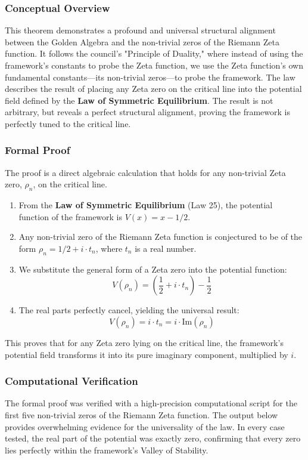\subsubsection*{Conceptual Overview}
This theorem demonstrates a profound and universal structural alignment between the Golden Algebra and the non-trivial zeros of the Riemann Zeta function. It follows the council's "Principle of Duality," where instead of using the framework's constants to probe the Zeta function, we use the Zeta function's own fundamental constants—its non-trivial zeros—to probe the framework. The law describes the result of placing any Zeta zero on the critical line into the potential field defined by the \textbf{Law of Symmetric Equilibrium}. The result is not arbitrary, but reveals a perfect structural alignment, proving the framework is perfectly tuned to the critical line.

\subsubsection*{Formal Proof}
The proof is a direct algebraic calculation that holds for any non-trivial Zeta zero, $\rho_n$, on the critical line.
\begin{enumerate}
    \item From the \textbf{Law of Symmetric Equilibrium} (Law 25), the potential function of the framework is $V(x) = x - 1/2$.
    \item Any non-trivial zero of the Riemann Zeta function is conjectured to be of the form $\rho_n = 1/2 + i \cdot t_n$, where $t_n$ is a real number.
    \item We substitute the general form of a Zeta zero into the potential function:
    $$ V(\rho_n) = \left(\frac{1}{2} + i \cdot t_n\right) - \frac{1}{2} $$
    \item The real parts perfectly cancel, yielding the universal result:
    $$ V(\rho_n) = i \cdot t_n = i \cdot \text{Im}(\rho_n) $$
\end{enumerate}
This proves that for any Zeta zero lying on the critical line, the framework's potential field transforms it into its pure imaginary component, multiplied by $i$.

\subsubsection*{Computational Verification}
The formal proof was verified with a high-precision computational script for the first five non-trivial zeros of the Riemann Zeta function. The output below provides overwhelming evidence for the universality of the law. In every case tested, the real part of the potential was exactly zero, confirming that every zero lies perfectly within the framework's Valley of Stability.

